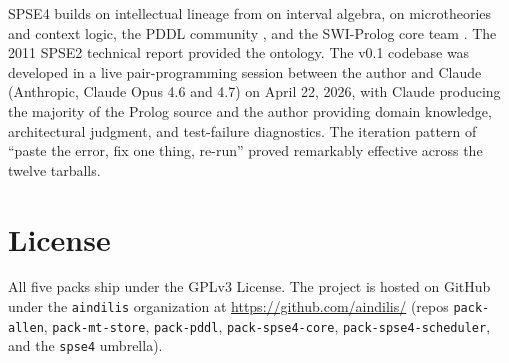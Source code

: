 \documentclass[11pt,letterpaper]{article}
\begin{document}
SPSE4 builds on intellectual lineage from \citet{allen-1983} on
interval algebra, \citet{guha-lenat-cyc-1990} on microtheories and
context logic, the PDDL community
\citep{fox-long-pddl21-2003,edelkamp-pddl22-2004}, and the SWI-Prolog
core team \citep{wielemaker-swipl-2012}. The 2011 SPSE2 technical
report provided the ontology. The v0.1 codebase was developed in a
live pair-programming session between the author and Claude
(Anthropic, Claude Opus 4.6 and 4.7) on April 22, 2026, with Claude
producing the majority of the Prolog source and the author providing
domain knowledge, architectural judgment, and test-failure
diagnostics. The iteration pattern of ``paste the error, fix one
thing, re-run'' proved remarkably effective across the twelve
tarballs.

\section*{License}

All five packs ship under the GPLv3 License. The project is hosted on
GitHub under the \texttt{aindilis} organization at
\url{https://github.com/aindilis/} (repos \texttt{pack-allen},
\texttt{pack-mt-store}, \texttt{pack-pddl}, \texttt{pack-spse4-core},
\texttt{pack-spse4-scheduler}, and the \texttt{spse4} umbrella).



\end{document}
